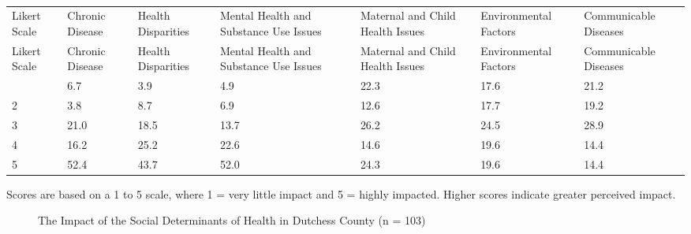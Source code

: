 \documentclass[
  english,
  letterpaper,
]{report}
\begin{document}
\begin{longtable}[]{@{}lllllll@{}}

\caption{\label{tbl-dc-impact-hlth-issue}The Impact of Health Issues in
Dutchess County (n = 106)}

\tabularnewline

\caption{}\label{T_a3e14}\tabularnewline
\toprule\noalign{}
Likert Scale & Chronic Disease & Health Disparities & Mental Health and
Substance Use Issues & Maternal and Child Health Issues & Environmental
Factors & Communicable Diseases \\
\midrule\noalign{}
\endfirsthead
\toprule\noalign{}
Likert Scale & Chronic Disease & Health Disparities & Mental Health and
Substance Use Issues & Maternal and Child Health Issues & Environmental
Factors & Communicable Diseases \\
\midrule\noalign{}
\endhead
\bottomrule\noalign{}
\endlastfoot
1 & 6.7 & 3.9 & 4.9 & 22.3 & 17.6 & 21.2 \\
2 & 3.8 & 8.7 & 6.9 & 12.6 & 17.7 & 19.2 \\
3 & 21.0 & 18.5 & 13.7 & 26.2 & 24.5 & 28.9 \\
4 & 16.2 & 25.2 & 22.6 & 14.6 & 19.6 & 14.4 \\
5 & 52.4 & 43.7 & 52.0 & 24.3 & 19.6 & 14.4 \\

\end{longtable}

\begin{tcolorbox}[enhanced jigsaw, breakable, leftrule=.75mm, title=\textcolor{quarto-callout-note-color}{\faInfo}\hspace{0.5em}{Note}, bottomrule=.15mm, opacityback=0, left=2mm, colback=white, bottomtitle=1mm, coltitle=black, colbacktitle=quarto-callout-note-color!10!white, colframe=quarto-callout-note-color-frame, opacitybacktitle=0.6, toptitle=1mm, titlerule=0mm, arc=.35mm, rightrule=.15mm, toprule=.15mm]

Scores are based on a 1 to 5 scale, where 1 = very little impact and 5 =
highly impacted. Higher scores indicate greater perceived impact.

\end{tcolorbox}

\begin{figure}


\caption{\label{fig-dc-impact-sdoh}The Impact of the Social Determinants
of Health in Dutchess County (n = 103)}

\end{figure}%
\end{document}
